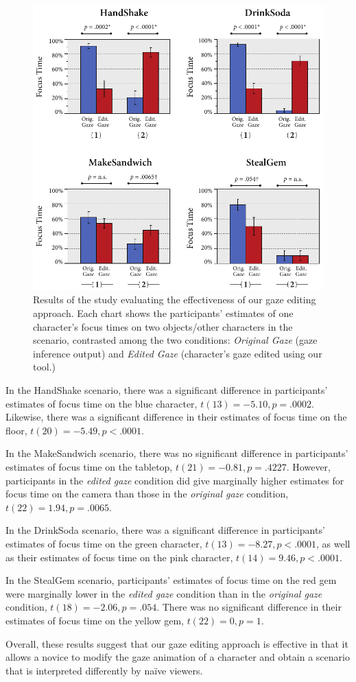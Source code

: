 \begin{figure}
\centering
\includegraphics[width=1\textwidth]{gazeauthoring/Figures/StudyResults2.pdf}
\caption{Results of the study evaluating the effectiveness of our gaze editing approach. Each chart shows the participants' estimates of one character's focus times on two objects/other characters in the scenario, contrasted among the two conditions: \emph{Original Gaze} (gaze inference output) and \emph{Edited Gaze} (character's gaze edited using our tool.)}
\label{fig:GazeEditEffectResults}
\end{figure}

In the HandShake scenario, there was a significant difference in participants' estimates of focus time on the blue character, $t(13) = -5.10, p = .0002$. Likewise, there was a significant difference in their estimates of focus time on the floor, $t(20) = -5.49, p < .0001$.

In the MakeSandwich scenario, there was no significant difference in participants' estimates of focus time on the tabletop, $t(21) = -0.81, p = .4227$. However, participants in the \emph{edited gaze} condition did give marginally higher estimates for focus time on the camera than those in the \emph{original gaze} condition, $t(22) = 1.94, p = .0065$.

In the DrinkSoda scenario, there was a significant difference in participants' estimates of focus time on the green character, $t(13) = -8.27, p < .0001$, as well as their estimates of focus time on the pink character, $t(14) = 9.46, p < .0001$.

In the StealGem scenario, participants' estimates of focus time on the red gem were marginally lower in the \emph{edited gaze} condition than in the \emph{original gaze} condition, $t(18) = -2.06, p = .054$. There was no significant difference in their estimates of focus time on the yellow gem, $t(22) = 0, p = 1$.

Overall, these results suggest that our gaze editing approach is effective in that it allows a novice to modify the gaze animation of a character and obtain a scenario that is interpreted differently by na{\"i}ve viewers.
